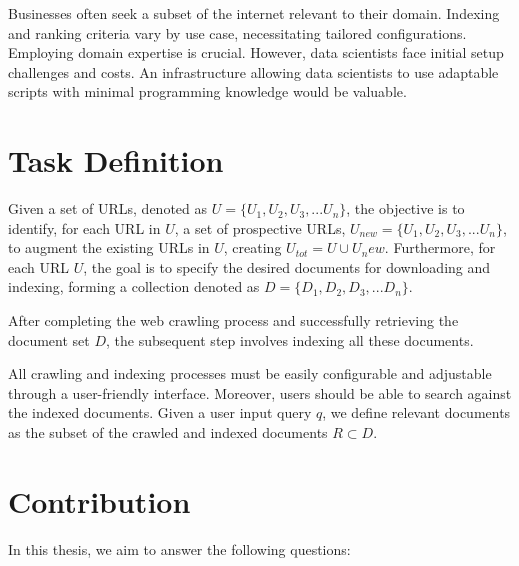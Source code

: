 Businesses often seek a subset of the internet relevant to their domain. Indexing and ranking criteria vary by use case, necessitating tailored configurations. Employing domain expertise is crucial. However, data scientists face initial setup challenges and costs. An infrastructure allowing data scientists to use adaptable scripts with minimal programming knowledge would be valuable. 

\section{Task Definition}
Given a set of URLs, denoted as $U = \{U_1, U_2, U_3, ...U_n\}$, the objective is to identify, for each URL in $U$, a set of prospective URLs, $U_{new} = \{U_1, U_2, U_3, ...U_n\}$, to augment the existing URLs in $U$, creating $U_{tot} = U \cup U{_new}$. Furthermore, for each URL $U$, the goal is to specify the desired documents for downloading and indexing, forming a collection denoted as $D = \{D_1, D_2, D_3, ...D_n\}$.

After completing the web crawling process and successfully retrieving the document set $D$, the subsequent step involves indexing all these documents. 

All crawling and indexing processes must be easily configurable and adjustable through a user-friendly interface. Moreover, users should be able to search against the indexed documents. Given a user input query $q$, we define relevant documents as the subset of the crawled and indexed documents $R \subset D$.

\section{Contribution}

In this thesis, we aim to answer the following questions:

